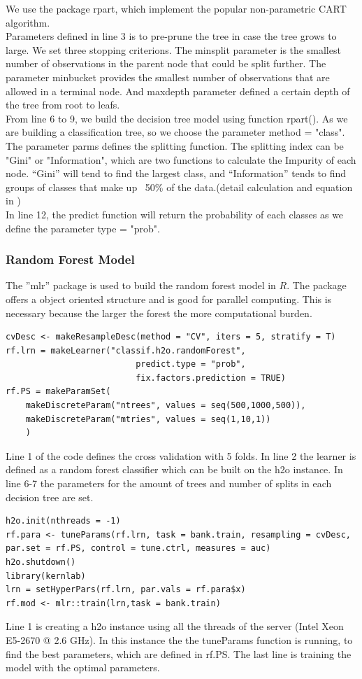     \noindent We use the package rpart, which implement the popular non-parametric CART algorithm. \\
     [\baselineskip]\indent Parameters defined in line 3 is to pre-prune the tree in case the tree grows to large. We set three stopping criterions. The minsplit parameter is the smallest number of observations in the parent node that could be split further. The parameter minbucket provides the smallest number of observations that are allowed in a terminal node. And maxdepth parameter defined a certain depth of the tree from root to leafs. \\
     [\baselineskip]\indent From line 6 to 9, we build the decision tree model using function rpart(). As we are building a classification tree, so we choose the parameter method = "class". The parameter parms defines the splitting function. The splitting index can be "Gini" or "Information", which are two functions to calculate the Impurity of each node. “Gini” will tend to find the largest class, and “Information” tends to find groups of classes that make up ~50\% of the data.(detail calculation and equation in \citep{terry})\\
     [\baselineskip]\indent In line 12, the predict function will return the probability of each classes as we define the parameter type = "prob".
     \subsubsection{Random Forest Model}
     \noindent The ''mlr'' package is used to build the random forest model in $R$. The package offers a object oriented structure and is good for parallel computing. This is necessary because the larger the forest the more computational burden. 
\begin{lstlisting}
cvDesc <- makeResampleDesc(method = "CV", iters = 5, stratify = T)
rf.lrn = makeLearner("classif.h2o.randomForest",
                          predict.type = "prob",
                          fix.factors.prediction = TRUE)
rf.PS = makeParamSet(
    makeDiscreteParam("ntrees", values = seq(500,1000,500)),
    makeDiscreteParam("mtries", values = seq(1,10,1))
    )
\end{lstlisting}
Line 1 of the code defines the cross validation with 5 folds. In line 2 the learner is defined as a random forest classifier which can be built on the h2o instance.
In line 6-7 the parameters for the amount of trees and number of splits in each decision tree are set. 

\begin{lstlisting}
h2o.init(nthreads = -1)
rf.para <- tuneParams(rf.lrn, task = bank.train, resampling = cvDesc, par.set = rf.PS, control = tune.ctrl, measures = auc)
h2o.shutdown()
library(kernlab)
lrn = setHyperPars(rf.lrn, par.vals = rf.para$x)
rf.mod <- mlr::train(lrn,task = bank.train)
\end{lstlisting}
Line 1 is creating a h2o instance using all the threads of the server (Intel Xeon E5-2670 @ 2.6 GHz). In this instance the the tuneParams function is running, to find the best parameters, which are defined in rf.PS. The last line is training the model with the optimal parameters.

